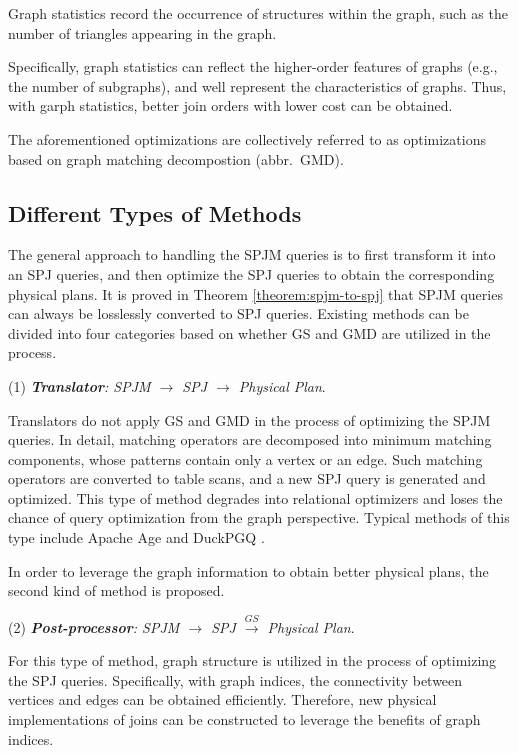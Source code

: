 \begin{definition}
    Graph statistics record the occurrence of structures within the graph, such as the number of triangles appearing in the graph.
\end{definition}

Specifically, graph statistics can reflect the higher-order features of graphs (e.g., the number of subgraphs), and well represent the characteristics of graphs.
Thus, with garph statistics, better join orders with lower cost can be obtained.

The aforementioned optimizations are collectively referred to as optimizations based on graph matching decompostion (abbr.~GMD).


\subsection{Different Types of Methods}
\label{sec:different-type-of-methods}

The general approach to handling the SPJM queries is to first transform it into an SPJ queries, and then optimize the SPJ queries to obtain the corresponding physical plans.
It is proved in Theorem \ref{theorem:spjm-to-spj} that SPJM queries can always be losslessly converted to SPJ queries.
Existing methods can be divided into four categories based on whether GS and GMD are utilized in the process.

(1) \emph{\textbf{Translator}: SPJM $\rightarrow$ SPJ $\rightarrow$ Physical Plan}.

Translators do not apply GS and GMD in the process of optimizing the SPJM queries.
In detail, matching operators are decomposed into minimum matching components, whose patterns contain only a vertex or an edge.
Such matching operators are converted to table scans, and a new SPJ query is generated and optimized.
This type of method degrades into relational optimizers and loses the chance of query optimization from the graph perspective.
Typical methods of this type include Apache Age \cite{apache-age} and DuckPGQ \cite{DuckPGQ,DuckPGQ-VLDB}.


In order to leverage the graph information to obtain better physical plans, the second kind of method is proposed.

(2) \emph{\textbf{Post-processor}: SPJM $\rightarrow$ SPJ $\xrightarrow{GS}$ Physical Plan}.

For this type of method, graph structure is utilized in the process of optimizing the SPJ queries.
Specifically, with graph indices, the connectivity between vertices and edges can be obtained efficiently.
Therefore, new physical implementations of joins can be constructed to leverage the benefits of graph indices.

